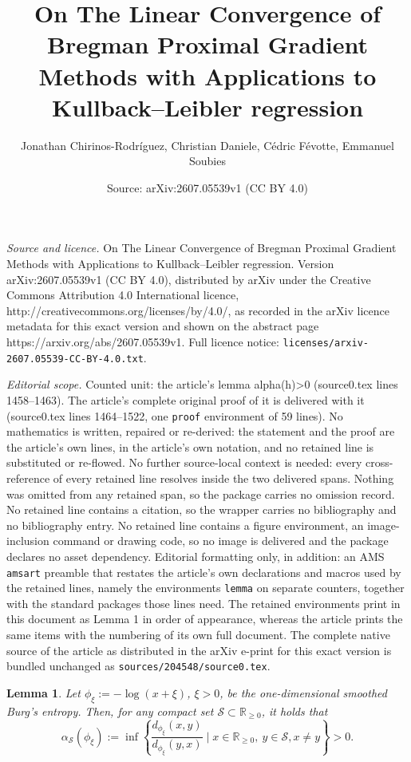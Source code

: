\documentclass[10pt,a4paper]{amsart}
\title{On The Linear Convergence of Bregman Proximal Gradient Methods with Applications to Kullback--Leibler regression}
\author{Jonathan Chirinos-Rodr\'iguez, Christian Daniele, C\'edric F\'evotte, Emmanuel Soubies}
\date{Source: arXiv:2607.05539v1 (CC BY 4.0)}
\newtheorem{lemma}{Lemma}
\begin{document}
\maketitle

\noindent\emph{Source and licence.} On The Linear Convergence of Bregman Proximal Gradient Methods with Applications to Kullback--Leibler regression. Version arXiv:2607.05539v1 (CC BY 4.0), distributed by arXiv under the Creative Commons Attribution 4.0 International licence, http://creativecommons.org/licenses/by/4.0/, as recorded in the arXiv licence metadata for this exact version and shown on the abstract page https://arxiv.org/abs/2607.05539v1. Full licence notice: \texttt{licenses/arxiv-2607.05539-CC-BY-4.0.txt}.\par\smallskip

\noindent\textit{Editorial scope.} Counted unit: the article's lemma alpha(h)>0 (source0.tex lines 1458--1463). The article's complete original proof of it is delivered with it (source0.tex lines 1464--1522, one \texttt{proof} environment of 59 lines). No mathematics is written, repaired or re-derived: the statement and the proof are the article's own lines, in the article's own notation, and no retained line is substituted or re-flowed.  No further source-local context is needed: every cross-reference of every retained line resolves inside the two delivered spans.  Nothing was omitted from any retained span, so the package carries no omission record.  No retained line contains a citation, so the wrapper carries no bibliography and no bibliography entry.  No retained line contains a figure environment, an image-inclusion command or drawing code, so no image is delivered and the package declares no asset dependency.  Editorial formatting only, in addition: an AMS \texttt{amsart} preamble that restates the article's own declarations and macros used by the retained lines, namely the environments \texttt{lemma} on separate counters, together with the standard packages those lines need.  The retained environments print in this document as Lemma 1 in order of appearance, whereas the article prints the same items with the numbering of its own full document.  The complete native source of the article as distributed in the arXiv e-print for this exact version is bundled unchanged as \texttt{sources/204548/source0.tex}.
\begin{lemma} \label{thm: alpha(h)>0}
Let $\phi_\xi:=- \log(x+\xi)$, $\xi>0$, be the one-dimensional smoothed Burg's entropy. Then, for any compact set $\mathcal{S}\subset \mathbb{R}_{\geq 0}$, it holds that
\begin{equation}
\alpha_{\mathcal{S}}(\phi_\xi):=\inf \left\{\frac{d_{\phi_\xi} (x,y)}{d_{\phi_\xi}(y,x)} \mid x\in \mathbb{R}_{\geq 0}, \ y \in \mathcal{S}, x\neq y\right\} >0.
\end{equation}
\end{lemma}
\end{document}
